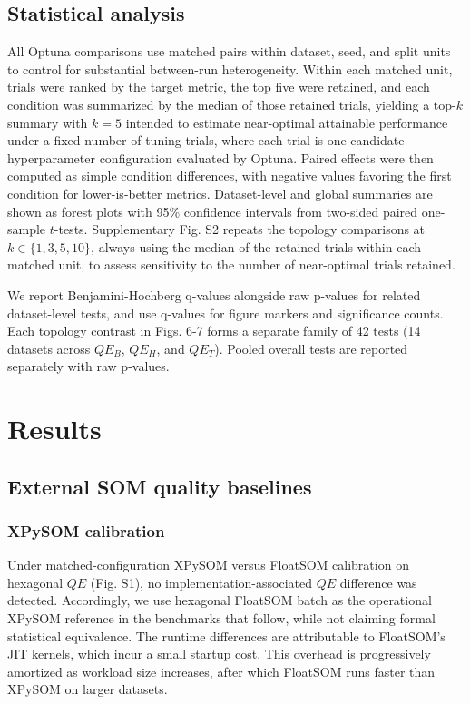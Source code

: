 \documentclass[10pt]{article} %
\begin{document}
\subsection{Statistical analysis}

All Optuna comparisons use matched pairs within dataset, seed, and split units to control for substantial between-run heterogeneity. Within each matched unit, trials were ranked by the target metric, the top five were retained, and each condition was summarized by the median of those retained trials, yielding a top-$k$ summary with $k=5$ intended to estimate near-optimal attainable performance under a fixed number of tuning trials, where each trial is one candidate hyperparameter configuration evaluated by Optuna. Paired effects were then computed as simple condition differences, with negative values favoring the first condition for lower-is-better metrics. Dataset-level and global summaries are shown as forest plots with 95\% confidence intervals from two-sided paired one-sample $t$-tests. Supplementary Fig. S2 repeats the topology comparisons at $k\in\{1,3,5,10\}$, always using the median of the retained trials within each matched unit, to assess sensitivity to the number of near-optimal trials retained.

We report Benjamini-Hochberg q-values alongside raw p-values for related dataset-level tests, and use q-values for figure markers and significance counts. Each topology contrast in Figs. 6-7 forms a separate family of 42 tests (14 datasets across $QE_B$, $QE_H$, and $QE_T$). Pooled overall tests are reported separately with raw p-values.

\section{Results}

\subsection{External SOM quality baselines}

\subsubsection{XPySOM calibration}

Under matched-configuration XPySOM versus FloatSOM calibration on hexagonal $QE$ (Fig. S1), no implementation-associated $QE$ difference was detected. Accordingly, we use hexagonal FloatSOM batch as the operational XPySOM reference in the benchmarks that follow, while not claiming formal statistical equivalence. The runtime differences are attributable to FloatSOM's JIT kernels, which incur a small startup cost. This overhead is progressively amortized as workload size increases, after which FloatSOM runs faster than XPySOM on larger datasets.
\end{document}
